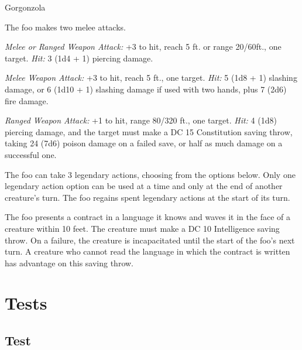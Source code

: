 \documentclass[letterpaper,twocolumn,openany,hidelinks]{memoir}
\begin{document}
\begin{RPGStatBlock}[float*=b,width=\textwidth + 8pt]{Gorgonzola}
\begin{multicols}{2}
		\columnbreak

		The foo makes two melee attacks.

		\textit{Melee or Ranged Weapon Attack:} +3 to hit, reach 5 ft. or range 20/60ft.,
		one target. \textit{Hit:} 3 (1d4 + 1) piercing damage.

		\textit{Melee Weapon Attack:} +3 to hit, reach 5 ft., one target. \textit{Hit:}
		5 (1d8 + 1) slashing damage, or 6 (1d10 + 1) slashing damage if used with two hands,
		plus 7 (2d6) fire damage.

		\textit{Ranged Weapon Attack:} +1 to hit, range 80/320 ft., one target.
		\textit{Hit:} 4 (1d8) piercing damage, and the target must make a DC 15 Constitution saving throw,
		taking 24 (7d6) poison damage on a failed save, or half as much damage on a successful one.

    	The foo can take 3 legendary actions, choosing from the options below.
		Only one legendary action option can be used at a time and only at the end of
		another creature's turn. The foo regains spent legendary actions at the start
		of its turn.

		\begin{RPGMonsterLegendaryActions}
			{The foo presents a contract in a language it knows and waves it in the face
			of a creature within 10 feet. The creature must make a DC 10 Intelligence
			saving throw. On a failure, the creature is incapacitated until the start of
			the foo's next turn. A creature who cannot read the language in which the
			contract is written has advantage on this saving throw.}
		\end{RPGMonsterLegendaryActions}
	\end{multicols}
\end{RPGStatBlock}

\part{Tests}
\chapter{Test}
\end{document}
